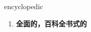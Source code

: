 
\begin{frame}
{\huge encyclopedic}
\begin{center}
\begin{enumerate}\Large
  \item \textbf{全面的，百科全书式的}
\end{enumerate}
\end{center}
\end{frame}
